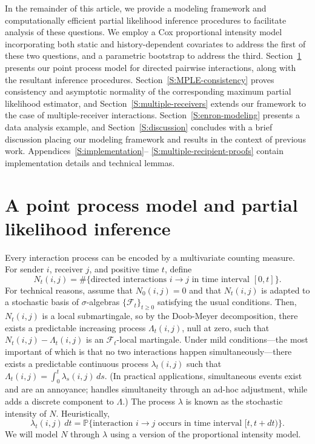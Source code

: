 \documentclass[final]{statsoc}
\begin{document}
In the remainder of this article, we provide a modeling framework and
computationally efficient partial likelihood inference procedures to
facilitate analysis of these questions.  We employ a Cox proportional
intensity model incorporating both static and history-dependent covariates
to address the first of these two questions, and a parametric bootstrap to
address the third. Section~\ref{S:point-process-model} presents our point
process model for directed pairwise interactions, along with the resultant
inference procedures. Section~\ref{S:MPLE-consistency} proves consistency
and asymptotic normality of the corresponding maximum partial likelihood
estimator, and Section~\ref{S:multiple-receivers} extends our framework to
the case of multiple-receiver interactions.  Section~\ref{S:enron-modeling}
presents a data analysis example, and Section~\ref{S:discussion} concludes
with a brief discussion placing our modeling framework and results in the context of previous work.  Appendices~\ref{S:implementation}--%
\ref{S:multiple-recipient-proofs} contain implementation details and
technical lemmas.


\section{A point process model and partial likelihood inference}
\label{S:point-process-model}

Every interaction process can be encoded by a multivariate counting measure.
For sender $i$, receiver $j$, and positive time $t$, define
\[
    N_t(i,j)
        =
        \#\{
            \text{directed interactions $i\rightarrow j$ in time interval
            $[0,t]$}
        \}.
\]
For technical reasons, assume that $N_0(i,j) = 0$ and that $N_t(i,j)$ is
adapted to a stochastic basis of $\sigma$-algebras
$\{ \mathcal{F}_t \}_{t \geq 0}$ satisfying the usual conditions.  Then,
$N_t(i,j)$ is a local submartingale, so by the Doob-Meyer decomposition,
there exists a predictable increasing process $\Lambda_t(i,j)$, null at
zero, such that $N_t(i,j) - \Lambda_t(i,j)$ is an $\mathcal{F}_t$-local
martingale.  Under mild conditions---the most important of which is that
no two interactions happen simultaneously---there exists a predictable
continuous process $\lambda_t(i,j)$ such that
\(
    \Lambda_t(i,j) = \int_0^t \lambda_s(i,j) \, ds.
\)
(In practical applications, simultaneous events exist and are an annoyance;
\citet{efron1977efficiency} handles simultaneity through an ad-hoc
adjustment, while \citet{brostrom2002cox} adds a discrete component
to $\Lambda$.)  The process $\lambda$ is known as the stochastic intensity
of $N$.  Heuristically,
\[
    \lambda_t(i,j) \, dt
        =
        \mathbb{P}\{
            \text{interaction $i\rightarrow j$ occurs in time interval $[t,t+dt)$}
        \}.
\]
We will model $N$ through $\lambda$ using a version of the \citet{cox1972regression}
proportional intensity model.
\end{document}
